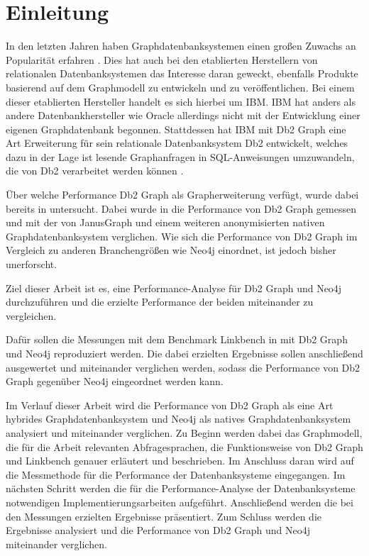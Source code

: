 \chapter{Einleitung}
\label{einleitung}

In den letzten Jahren haben Graphdatenbanksystemen einen großen Zuwachs an Popularität erfahren \cite{db_engines_ranking_july}. Dies hat auch bei den etablierten Herstellern von relationalen Datenbanksystemen das Interesse daran geweckt, ebenfalls Produkte basierend auf dem Graphmodell zu entwickeln und zu veröffentlichen. Bei einem dieser etablierten Hersteller handelt es sich hierbei um IBM. IBM hat anders als andere Datenbankhersteller wie Oracle allerdings nicht mit der Entwicklung einer eigenen Graphdatenbank begonnen. Stattdessen hat IBM mit Db2 Graph eine Art Erweiterung für sein relationale Datenbanksystem Db2 entwickelt, welches dazu in der Lage ist lesende Graphanfragen in SQL-Anweisungen umzuwandeln, die von Db2 verarbeitet werden können \cite{sigmod_tian}. 

Über welche Performance Db2 Graph als Grapherweiterung verfügt, wurde dabei bereits in \cite{sigmod_tian} untersucht. Dabei wurde in \cite{sigmod_tian} die Performance von Db2 Graph gemessen und mit der von JanusGraph und einem weiteren anonymisierten nativen Graphdatenbanksystem verglichen. Wie sich die Performance von Db2 Graph im Vergleich zu anderen Branchengrößen wie Neo4j einordnet, ist jedoch bisher unerforscht. 

Ziel dieser Arbeit ist es, eine Performance-Analyse für Db2 Graph und Neo4j durchzuführen und die erzielte Performance der beiden miteinander zu vergleichen. 

Dafür sollen die Messungen mit dem Benchmark Linkbench in \cite{sigmod_tian} mit Db2 Graph und Neo4j reproduziert werden. Die dabei erzielten Ergebnisse sollen anschließend ausgewertet und miteinander verglichen werden, sodass die Performance von Db2 Graph gegenüber Neo4j eingeordnet werden kann. 

Im Verlauf dieser Arbeit wird die Performance von Db2 Graph als eine Art hybrides Graphdatenbanksystem und Neo4j als natives Graphdatenbanksystem analysiert und miteinander verglichen. Zu Beginn werden dabei das Graphmodell, die für die Arbeit relevanten Abfragesprachen, die Funktionsweise von Db2 Graph und Linkbench genauer erläutert und beschrieben. Im Anschluss daran wird auf die Messmethode für die Performance der Datenbanksysteme eingegangen. Im nächsten Schritt werden die für die Performance-Analyse der Datenbanksysteme notwendigen Implementierungsarbeiten aufgeführt. Anschließend werden die bei den Messungen erzielten Ergebnisse präsentiert. Zum Schluss werden die Ergebnisse analysiert und die Performance von  Db2 Graph und Neo4j miteinander verglichen. 